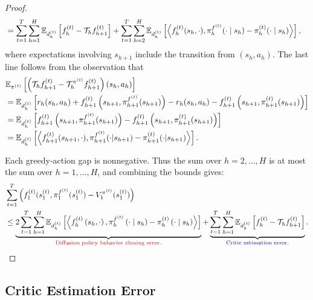\begin{proof}
\begin{align*}
        &= \sum_{t=1}^T \sum_{h=1}^H \mathbb{E}_{d_h^{(t)}}\left[f_h^{(t)}-{\mathcal{T}}_hf_{h+1}^{(t)}\right] + \sum_{t=1}^T\sum_{h=2}^H \mathbb{E}_{d_h^{(t)}}\left[\left\langle f_h^{(t)}(s_h,\cdot),\pi_h^{f^{(t)}}(\cdot\mid s_h)-\pi_h^{(t)}(\cdot\mid s_h)\right\rangle\right],
    \end{align*}
    where expectations involving $s_{h+1}$ include the transition from $(s_h,a_h)$. The last line follows from the observation that
\begin{align*}
& \mathbb{E}_{\pi^{(t)}}\left[\left({\mathcal{T}}_h f_{h+1}^{(t)} -{\mathcal{T}}_h^{\pi^{(t)}}f_{h+1}^{(t)}\right)\left(s_h, a_h\right)\right]\\
        &= \mathbb{E}_{d_h^{(t)}}\left[r_h(s_h, a_h) + f_{h+1}^{(t)}\left(s_{h+1}, \pi_{h+1}^{f^{(t)}}(s_{h+1})\right) - r_h(s_h, a_h) - f_{h+1}^{(t)}\left(s_{h+1}, \pi_{h+1}^{(t)}(s_{h+1})\right) \right] \\
        &= \mathbb{E}_{d_h^{(t)}}\left[f_{h+1}^{(t)}\left(s_{h+1}, \pi_{h+1}^{f^{(t)}}(s_{h+1})\right) - f_{h+1}^{(t)}\left(s_{h+1}, \pi_{h+1}^{(t)}(s_{h+1})\right) \right] \\
        &=  \mathbb{E}_{d_h^{(t)}}\left[\left\langle f_{h+1}^{(t)}(s_{h+1},\cdot), \pi_{h+1}^{f^{(t)}} (\cdot | s_{h+1}) -\pi_{h+1}^{(t)}(\cdot | s_{h+1}) \right\rangle\right].
    \end{align*}
    
    Each greedy-action gap is nonnegative. Thus the sum over $h=2,\ldots,H$ is at most the sum over $h=1,\ldots,H$, and combining the bounds gives:
    \begin{align*}
        &\sum_{t=1}^T\left(f_1^{(t)}(s_1^{(t)}, \pi_1^{f^{(t)}}(s_1^{(t)})-V_1^{\pi^{(t)}}(s_1^{(t)})\right)  \\
        &\leq \underbrace{2\sum_{t=1}^T\sum_{h=1}^H \mathbb{E}_{d_h^{(t)}}\left[\left\langle f_h^{(t)}\left(s_h, \cdot\right), \pi_h^{f^{(t)}}\left(\cdot \mid s_h\right)-\pi_h^{(t)}\left(\cdot \mid s_h\right)\right\rangle\right]}_{\textcolor{red}{\text{Diffusion policy behavior cloning error.}}} + \underbrace{\sum_{t=1}^T \sum_{h=1}^H \mathbb{E}_{d_h^{(t)}}\left[f_h^{(t)}-{\mathcal{T}}_h f_{h+1}^{(t)}\right]}_{\textcolor{blue}{\text{Critic estimation error.}}} .
    \end{align*}

\end{proof}

\subsection{Critic Estimation Error}

